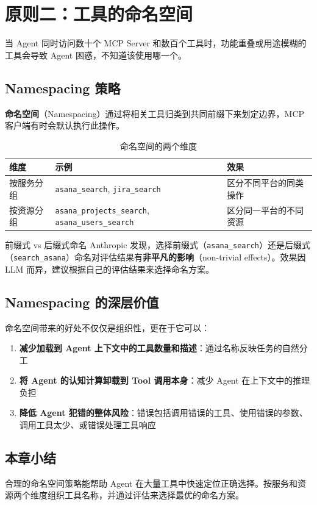 \section{原则二：工具的命名空间}

当 Agent 同时访问数十个 MCP Server 和数百个工具时，功能重叠或用途模糊的工具会导致 Agent 困惑，不知道该使用哪一个。

\subsection{Namespacing 策略}

\textbf{命名空间}（Namespacing）通过将相关工具归类到共同前缀下来划定边界，MCP 客户端有时会默认执行此操作。

\begin{table}[H]
\centering
\caption{命名空间的两个维度}
\begin{tabular}{p{}p{}p{}}
\toprule
\textbf{维度} & \textbf{示例} & \textbf{效果} \\
\midrule
按服务分组 & \texttt{asana\_search}, \texttt{jira\_search} & 区分不同平台的同类操作 \\
\midrule
按资源分组 & \texttt{asana\_projects\_search}, \texttt{asana\_users\_search} & 区分同一平台的不同资源 \\
\bottomrule
\end{tabular}
\end{table}

\begin{knowledgebox}{前缀式 vs 后缀式命名}
Anthropic 发现，选择前缀式（\texttt{asana\_search}）还是后缀式（\texttt{search\_asana}）命名对评估结果有\textbf{非平凡的影响}（non-trivial effects）。效果因 LLM 而异，建议根据自己的评估结果来选择命名方案。
\end{knowledgebox}

\subsection{Namespacing 的深层价值}

命名空间带来的好处不仅仅是组织性，更在于它可以：

\begin{enumerate}[leftmargin=1.5em]
    \item \textbf{减少加载到 Agent 上下文中的工具数量和描述}：通过名称反映任务的自然分工
    \item \textbf{将 Agent 的认知计算卸载到 Tool 调用本身}：减少 Agent 在上下文中的推理负担
    \item \textbf{降低 Agent 犯错的整体风险}：错误包括调用错误的工具、使用错误的参数、调用工具太少、或错误处理工具响应
\end{enumerate}

\subsection{本章小结}

合理的命名空间策略能帮助 Agent 在大量工具中快速定位正确选择。按服务和资源两个维度组织工具名称，并通过评估来选择最优的命名方案。


